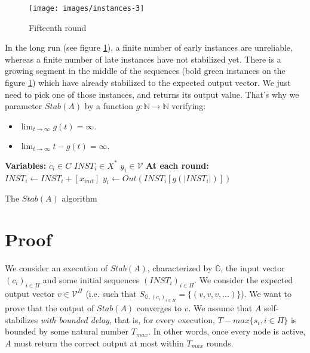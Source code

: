 \documentclass[11pt,letterpaper]{article}
\begin{document}
\begin{figure}[h!]
	\texttt{[image: images/instances-3]}
	\caption{Fifteenth round}
	\label{fig:fig3}
\end{figure}

In the long run (see figure \ref{fig:fig3}), a finite number of early instances are unreliable, whereas a finite number of late instances have not stabilized yet.
There is a growing segment in the middle of the sequences (bold green instances on the figure \ref{fig:fig3}) which have already stabilized to the expected output vector.
We just need to pick one of those instances, and returns its output value.
That's why we parameter $Stab(A)$ by a function $g : \mathds{N} \rightarrow \mathds{N}$ verifying:

\begin{itemize}
	\item $\lim_{t \rightarrow \infty} g(t) = \infty.$
	\item $\lim_{t \rightarrow \infty} t-g(t) = \infty.$
\end{itemize}

\begin{algorithm}[h!]
	\DontPrintSemicolon
	\textbf{Variables:} \;
	\Indp
		$c_i \in C$  \;
		$INST_i \in X^*$  \;
		$y_i \in \mathcal{V}$  \;
	\BlankLine
	\Indm
	\textbf{At each round:} \;
	\Indp
		$INST_i \leftarrow INST_i + [x_{init}]$  \label{line:create} \;
		$y_i \leftarrow Out(INST_i[g(|INST_i|)])$ \label{line:output} \;
	\Indm
	\caption{The $Stab(A)$ algorithm} 
\end{algorithm}

\section{Proof}

We consider an execution of $Stab(A)$, characterized by $\mathds{G}$, the input vector $(c_i)_{i \in \Pi}$ and some initial sequences $(INST_i)_{i \in \Pi}$.
We consider the expected output vector $v \in \mathcal{V}^\Pi$ (i.e. such that $S_{\mathds{G}, (c_i)_{i \in \Pi}} = \{(v, v, v, \dots)\}$).
We want to prove that the output of $Stab(A)$ converges to $v$.
We assume that $A$ self-stabilizes \textit{with bounded delay}, that is, for every execution,
$T-max\{s_i, i \in \Pi\}$ is bounded by some natural number $T_{max}$.
In other words, once every node is active, $A$ must return the correct output at most within $T_{max}$ rounds.
\end{document}
